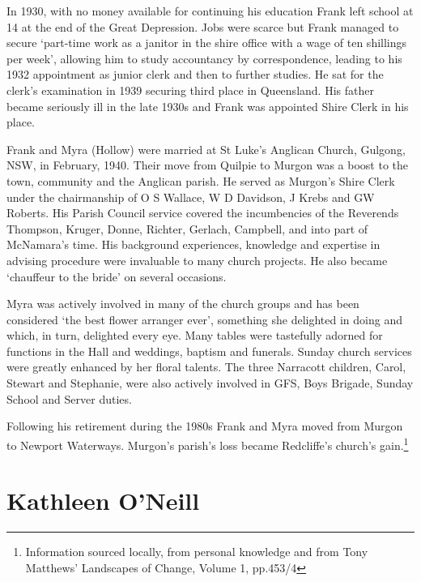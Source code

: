 In 1930, with no money available for continuing his education Frank left school at 14 at the end of the Great Depression. Jobs were scarce but Frank managed to secure `part-time work as a janitor in the shire office with a wage of ten shillings per week', allowing him to study accountancy by correspondence, leading to his 1932 appointment as junior clerk and then to further studies. He sat for the clerk's examination in 1939 securing third place in Queensland. His father became seriously ill in the late 1930s and Frank was appointed Shire Clerk in his place.



Frank and Myra (Hollow) were married at St Luke's Anglican Church, Gulgong, NSW, in February, 1940. Their move from Quilpie to Murgon was a boost to the town, community and the Anglican parish. He served as Murgon's Shire Clerk under the chairmanship of O S Wallace, W D Davidson, J Krebs and GW Roberts. His Parish Council service covered the incumbencies of the Reverends Thompson, Kruger, Donne, Richter, Gerlach, Campbell, and into part of McNamara's time. His background experiences, knowledge and expertise in advising procedure were invaluable to many church projects. He also became `chauffeur to the bride' on several occasions.



Myra was actively involved in many of the church groups and has been considered `the best flower arranger ever', something she delighted in doing and which, in turn, delighted every eye. Many tables were tastefully adorned for functions in the Hall and weddings, baptism and funerals. Sunday church services were greatly enhanced by her floral talents. The three Narracott children, Carol, Stewart and Stephanie, were also actively involved in GFS, Boys Brigade, Sunday School and Server duties.



Following his retirement during the 1980s Frank and Myra moved from Murgon to Newport Waterways. Murgon's parish's loss became Redcliffe's church's gain.\footnote{Information sourced locally, from personal knowledge and from Tony Matthews' Landscapes of Change, Volume 1, pp.453/4}


\section{Kathleen O'Neill}



